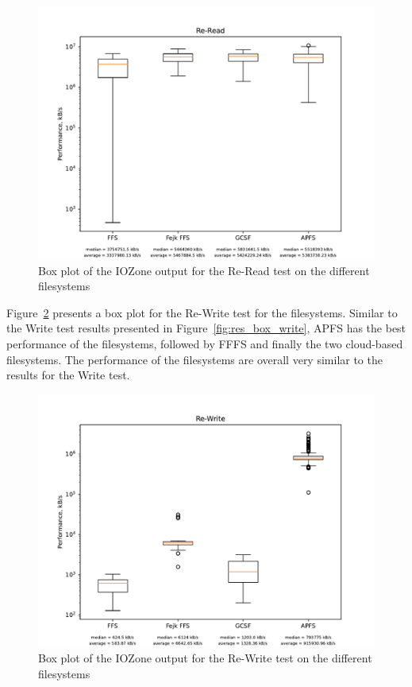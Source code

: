 \begin{figure}[!htb]
	\label{fig:res_box_reread}
	\begin{center}
		\includegraphics[width=1.0\textwidth]{figures/benchmarking/Re-Read_box.pdf}
	\end{center}
	\caption{Box plot of the IOZone output for the Re-Read test on the different filesystems}
\end{figure}

Figure~\ref{fig:res_box_rewrite} presents a box plot for the \mbox{Re-Write} test for the filesystems. Similar to the Write test results presented in Figure~\ref{fig:res_box_write}, \gls{APFS} has the best performance of the filesystems, followed by \gls{FFFS} and finally the two cloud-based filesystems. The performance of the filesystems are overall very similar to the results for the Write test. 

\begin{figure}[!htb]
	\label{fig:res_box_rewrite}
	\begin{center}
		\includegraphics[width=1.0\textwidth]{figures/benchmarking/Re-Write_box.pdf}
	\end{center}
	\caption{Box plot of the IOZone output for the Re-Write test on the different filesystems}
\end{figure}


